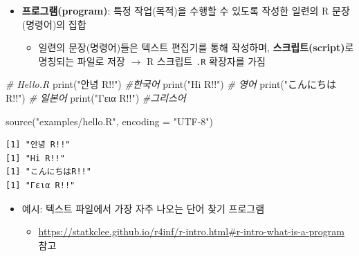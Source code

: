 \documentclass[
  11pt,
]{krantz}
\newenvironment{Shaded}{\begin{snugshade}}{\end{snugshade}}
\newcommand{\AttributeTok}[1]{\textcolor[rgb]{0.61,0.61,0.61}{#1}}
\newcommand{\CommentTok}[1]{\textcolor[rgb]{0.37,0.37,0.37}{\textit{#1}}}
\newcommand{\FunctionTok}[1]{\textcolor[rgb]{0,0,0}{#1}}
\newcommand{\NormalTok}[1]{#1}
\newcommand{\StringTok}[1]{\textcolor[rgb]{0.5,0.5,0.5}{#1}}
\providecommand{\tightlist}{%
  \setlength{\itemsep}{0pt}\setlength{\parskip}{0pt}}
\begin{document}
\begin{itemize}
\tightlist
\item
  \textbf{프로그램(program)}: 특정 작업(목적)을 수행할 수 있도록 작성한 일련의 R 문장(명령어)의 집합

  \begin{itemize}
  \tightlist
  \item
    일련의 문장(명령어)들은 텍스트 편집기를 통해 작성하며, \textbf{스크립트(script)}로 명칭되는 파일로 저장 \(\rightarrow\) R 스크립트 \texttt{.R} 확장자를 가짐
  \end{itemize}
\end{itemize}

\footnotesize

\begin{Shaded}
\begin{Highlighting}[]
\CommentTok{\# Hello.R }
\FunctionTok{print}\NormalTok{(}\StringTok{"안녕 R!!"}\NormalTok{) }\CommentTok{\#한국어}
\FunctionTok{print}\NormalTok{(}\StringTok{"Hi R!!"}\NormalTok{) }\CommentTok{\# 영어}
\FunctionTok{print}\NormalTok{(}\StringTok{"こんにちはR!!"}\NormalTok{) }\CommentTok{\# 일본어}
\FunctionTok{print}\NormalTok{(}\StringTok{"Γεια R!!"}\NormalTok{) }\CommentTok{\#그리스어}
\end{Highlighting}
\end{Shaded}

\normalsize

\footnotesize

\begin{Shaded}
\begin{Highlighting}[]
\FunctionTok{source}\NormalTok{(}\StringTok{"examples/hello.R"}\NormalTok{, }\AttributeTok{encoding =} \StringTok{"UTF{-}8"}\NormalTok{)}
\end{Highlighting}
\end{Shaded}

\begin{verbatim}
[1] "안녕 R!!"
[1] "Hi R!!"
[1] "こんにちはR!!"
[1] "Γεια R!!"
\end{verbatim}

\normalsize

\begin{itemize}
\tightlist
\item
  예시: 텍스트 파일에서 가장 자주 나오는 단어 찾기 프로그램

  \begin{itemize}
  \tightlist
  \item
    \url{https://statkclee.github.io/r4inf/r-intro.html\#r-intro-what-is-a-program} 참고
  \end{itemize}
\end{itemize}
\end{document}
